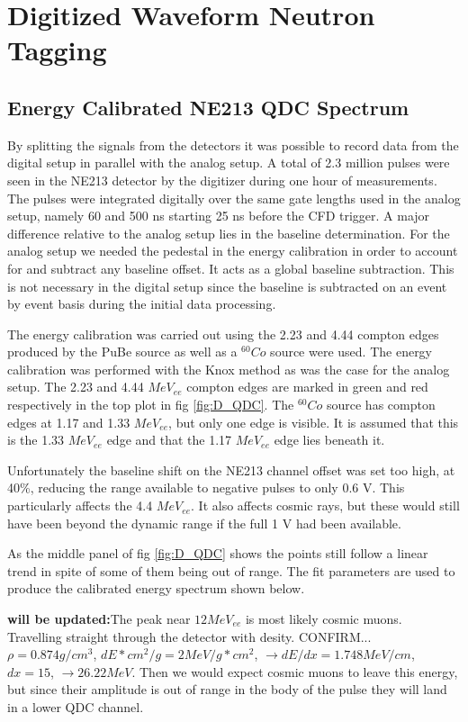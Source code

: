 \documentclass[main.tex]{subfiles}
\begin{document}
\section{Digitized Waveform Neutron Tagging}

\subsection{Energy Calibrated NE213 QDC Spectrum}
By splitting the signals from the detectors it was possible to record data from the digital setup in parallel with the analog setup. A total of 2.3 million pulses were seen in the NE213 detector by the digitizer during one hour of measurements. The pulses were integrated digitally over the same gate lengths used in the analog setup, namely 60 and 500 ns starting 25 ns before the CFD trigger. A major difference relative to the analog setup lies in the baseline determination. For the analog setup we needed the pedestal in the energy calibration in order to account for and subtract any baseline offset. It acts as a global baseline subtraction. This is not necessary in the digital setup since the baseline is subtracted on an event by event basis during the initial data processing. 

The energy calibration was carried out using the 2.23 and 4.44 compton edges produced by the PuBe source as well as a $^{60}Co$ source were used. The energy calibration was performed with the Knox method as was the case for the analog setup. The 2.23 and 4.44 $MeV_{ee}$ compton edges are marked in green and red respectively in the top plot in fig \ref{fig:D_QDC}. The $^{60}Co$ source has compton edges at 1.17 and 1.33 $MeV_{ee}$, but only one edge is visible. It is assumed that this is the 1.33 $MeV_{ee}$ edge and that the 1.17 $MeV_{ee}$ edge lies beneath it. 

Unfortunately the baseline shift on the NE213 channel offset was set too high, at 40\%, reducing the range available to negative pulses to only 0.6 V. This particularly affects the 4.4 $MeV_{ee}$. It also affects cosmic rays, but these would still have been beyond the dynamic range if the full 1 V had been available.

As the middle panel of fig \ref{fig:D_QDC} shows the points still follow a linear trend in spite of some of them being out of range. The fit parameters are used to produce the calibrated energy spectrum shown below. 

\textbf{will be updated:}The peak near $12 MeV_{ee}$ is most likely cosmic muons. Travelling straight through the detector with desity. CONFIRM... $\rho=0.874g/cm^3$, $dE*cm^2/g=2MeV/g*cm^2$, $\rightarrow dE/dx= 1.748MeV/cm$, $dx=15$, $\rightarrow 26.22 MeV$. Then we would expect cosmic muons to leave this energy, but since their amplitude is out of range in the body of the pulse they will land in a lower QDC channel.
\end{document}
